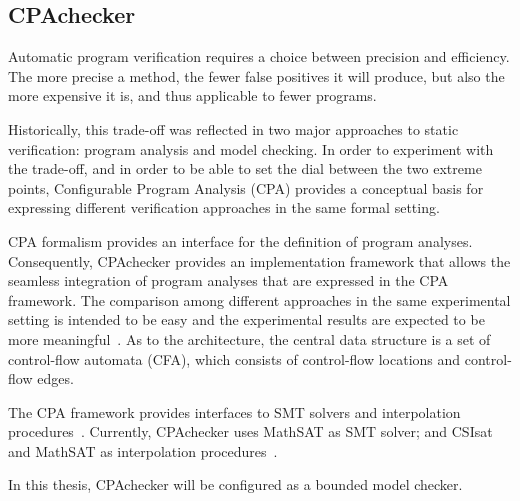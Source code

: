 \subsection{CPAchecker}

Automatic program verification requires a choice between precision and efficiency. The more precise a method, the fewer false positives it will produce, but also the more expensive it is, and thus applicable to fewer programs. 

Historically, this trade-off was reflected in two major approaches to static verification: program analysis and model checking. In order to experiment with the trade-off, and in order to be able to set the dial between the two extreme points, Configurable Program Analysis (CPA) provides a conceptual basis for expressing different verification approaches in the same formal setting. 

CPA formalism provides an interface for the definition of program analyses. Consequently, CPAchecker provides an implementation framework that allows the seamless integration of program analyses that are expressed in the CPA framework. The comparison among different approaches in the same experimental setting is intended to be easy and the experimental results are expected to be more meaningful~\cite{Beyer2011}. As to the architecture, the central data structure is a set of control-flow automata (CFA), which consists of control-flow locations and control-flow edges. 

The CPA framework provides interfaces to SMT solvers and interpolation procedures~\cite{Beyer2011}. Currently, CPAchecker uses MathSAT as SMT solver; and CSIsat and MathSAT as interpolation procedures~\cite{Beyer2011}. %

In this thesis, CPAchecker will be configured as a bounded model checker.

